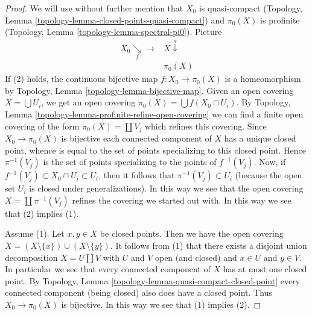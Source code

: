 \begin{proof}
We will use without further mention that
$X_0$ is quasi-compact
(Topology, Lemma \ref{topology-lemma-closed-points-quasi-compact})
and $\pi_0(X)$ is profinite
(Topology, Lemma \ref{topology-lemma-spectral-pi0}).
Picture
$$
\begin{array}{cc}X_0 \underset{f}{\searrow}\longrightarrow & X \overset{\pi}{\downarrow} \\  & \pi_0(X)\end{array}
$$
If (2) holds, the continuous bijective map $f : X_0 \to \pi_0(X)$ is
a homeomorphism by
Topology, Lemma \ref{topology-lemma-bijective-map}.
Given an open covering $X = \bigcup U_i$, we get an open covering
$\pi_0(X) = \bigcup f(X_0 \cap U_i)$. By
Topology, Lemma \ref{topology-lemma-profinite-refine-open-covering}
we can find a finite open covering of the form $\pi_0(X) = \coprod V_j$
which refines this covering.
Since $X_0 \to \pi_0(X)$ is bijective each connected component of
$X$ has a unique closed point, whence is equal to the set of points
specializing to this closed point. Hence $\pi^{-1}(V_j)$ is the
set of points specializing to the points of $f^{-1}(V_j)$.
Now, if $f^{-1}(V_j) \subset X_0 \cap U_i \subset U_i$, then
it follows that $\pi^{-1}(V_j) \subset U_i$ (because the open set
$U_i$ is closed under generalizations). In this way we see
that the open covering $X = \coprod \pi^{-1}(V_j)$ refines
the covering we started out with. In this way we see that
(2) implies (1).

\medskip\noindent
Assume (1). Let $x, y \in X$ be closed points. Then we have the open covering
$X = (X \setminus \{x\}) \cup (X \setminus \{y\})$.
It follows from (1) that there exists a disjoint union decomposition
$X = U \amalg V$ with $U$ and $V$ open (and closed) and $x \in U$ and
$y \in V$. In particular we see that every connected component of $X$
has at most one closed point. By
Topology, Lemma \ref{topology-lemma-quasi-compact-closed-point}
every connected component (being closed) also does have a closed point.
Thus $X_0 \to \pi_0(X)$ is bijective. In this way we see that (1) implies (2).


\end{proof}
